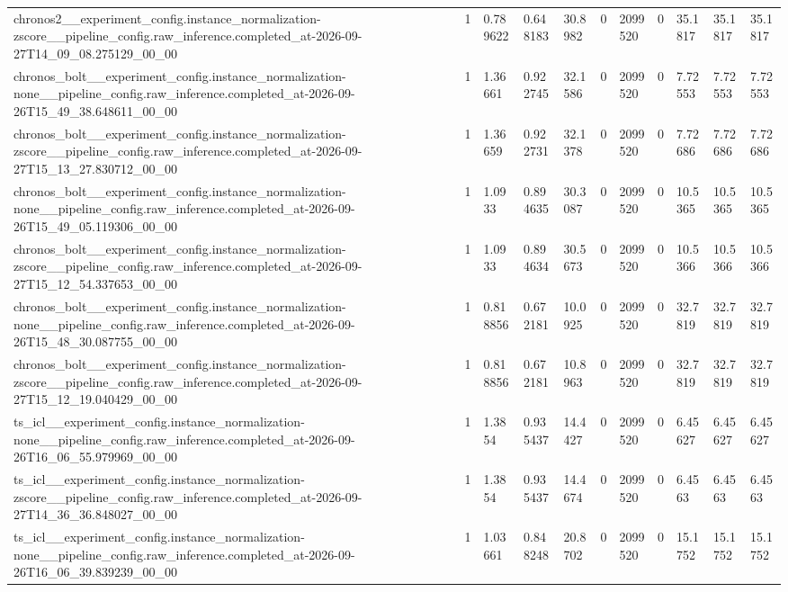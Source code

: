 \begin{tabular}{lllllllllll}
chronos2\_\_experiment\_config.instance\_normalization-zscore\_\_pipeline\_config.raw\_inference.completed\_at-2026-09-27T14\_09\_08.275129\_00\_00 & 1 & 0.789622 & 0.648183 & 30.8982 & 0 & 2099520 & 0 & 35.1817 & 35.1817 & 35.1817 \\
chronos\_bolt\_\_experiment\_config.instance\_normalization-none\_\_pipeline\_config.raw\_inference.completed\_at-2026-09-26T15\_49\_38.648611\_00\_00 & 1 & 1.36661 & 0.922745 & 32.1586 & 0 & 2099520 & 0 & 7.72553 & 7.72553 & 7.72553 \\
chronos\_bolt\_\_experiment\_config.instance\_normalization-zscore\_\_pipeline\_config.raw\_inference.completed\_at-2026-09-27T15\_13\_27.830712\_00\_00 & 1 & 1.36659 & 0.922731 & 32.1378 & 0 & 2099520 & 0 & 7.72686 & 7.72686 & 7.72686 \\
chronos\_bolt\_\_experiment\_config.instance\_normalization-none\_\_pipeline\_config.raw\_inference.completed\_at-2026-09-26T15\_49\_05.119306\_00\_00 & 1 & 1.0933 & 0.894635 & 30.3087 & 0 & 2099520 & 0 & 10.5365 & 10.5365 & 10.5365 \\
chronos\_bolt\_\_experiment\_config.instance\_normalization-zscore\_\_pipeline\_config.raw\_inference.completed\_at-2026-09-27T15\_12\_54.337653\_00\_00 & 1 & 1.0933 & 0.894634 & 30.5673 & 0 & 2099520 & 0 & 10.5366 & 10.5366 & 10.5366 \\
chronos\_bolt\_\_experiment\_config.instance\_normalization-none\_\_pipeline\_config.raw\_inference.completed\_at-2026-09-26T15\_48\_30.087755\_00\_00 & 1 & 0.818856 & 0.672181 & 10.0925 & 0 & 2099520 & 0 & 32.7819 & 32.7819 & 32.7819 \\
chronos\_bolt\_\_experiment\_config.instance\_normalization-zscore\_\_pipeline\_config.raw\_inference.completed\_at-2026-09-27T15\_12\_19.040429\_00\_00 & 1 & 0.818856 & 0.672181 & 10.8963 & 0 & 2099520 & 0 & 32.7819 & 32.7819 & 32.7819 \\
ts\_icl\_\_experiment\_config.instance\_normalization-none\_\_pipeline\_config.raw\_inference.completed\_at-2026-09-26T16\_06\_55.979969\_00\_00 & 1 & 1.3854 & 0.935437 & 14.4427 & 0 & 2099520 & 0 & 6.45627 & 6.45627 & 6.45627 \\
ts\_icl\_\_experiment\_config.instance\_normalization-zscore\_\_pipeline\_config.raw\_inference.completed\_at-2026-09-27T14\_36\_36.848027\_00\_00 & 1 & 1.3854 & 0.935437 & 14.4674 & 0 & 2099520 & 0 & 6.4563 & 6.4563 & 6.4563 \\
ts\_icl\_\_experiment\_config.instance\_normalization-none\_\_pipeline\_config.raw\_inference.completed\_at-2026-09-26T16\_06\_39.839239\_00\_00 & 1 & 1.03661 & 0.848248 & 20.8702 & 0 & 2099520 & 0 & 15.1752 & 15.1752 & 15.1752 \\

\end{tabular}
